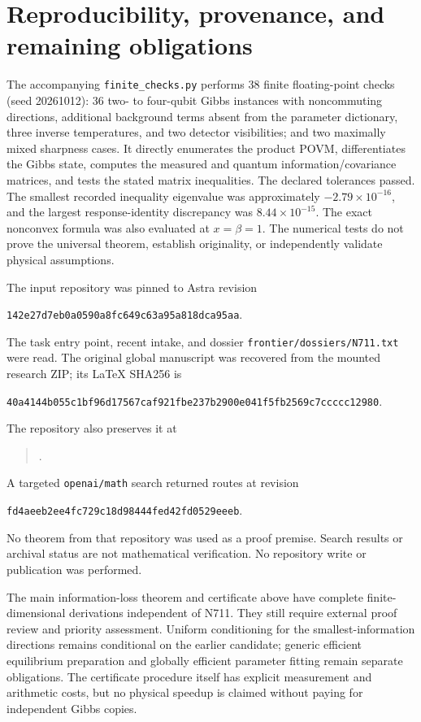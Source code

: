\documentclass[11pt,a4paper]{article}
\theoremstyle{remark}
\begin{document}
\section{Reproducibility, provenance, and remaining obligations}

The accompanying \texttt{finite\_checks.py} performs 38 finite floating-point checks (seed 20261012): 36 two- to four-qubit Gibbs instances with noncommuting directions, additional background terms absent from the parameter dictionary, three inverse temperatures, and two detector visibilities; and two maximally mixed sharpness cases. It directly enumerates the product POVM, differentiates the Gibbs state, computes the measured and quantum information/covariance matrices, and tests the stated matrix inequalities. The declared tolerances passed. The smallest recorded inequality eigenvalue was approximately $-2.79\times10^{-16}$, and the largest response-identity discrepancy was $8.44\times10^{-15}$. The exact nonconvex formula was also evaluated at $x=\beta=1$. The numerical tests do not prove the universal theorem, establish originality, or independently validate physical assumptions.

The input repository was pinned to Astra revision
\begin{center}\small\texttt{142e27d7eb0a0590a8fc649c63a95a818dca95aa}.\end{center}
The task entry point, recent intake, and dossier \texttt{frontier/dossiers/N711.txt} were read. The original global manuscript was recovered from the mounted research ZIP; its LaTeX SHA256 is
\begin{center}\footnotesize\texttt{40a4144b055c1bf96d17567caf921fbe237b2900e041f5fb2569c7ccccc12980}.\end{center}
The repository also preserves it at
\begin{quote}\small{}.\end{quote}
A targeted \texttt{openai/math} search returned routes at revision
\begin{center}\small\texttt{fd4aeeb2ee4fc729c18d98444fed42fd0529eeeb}.\end{center}
No theorem from that repository was used as a proof premise. Search results or archival status are not mathematical verification. No repository write or publication was performed.

The main information-loss theorem and certificate above have complete finite-dimensional derivations independent of N711. They still require external proof review and priority assessment. Uniform conditioning for the smallest-information directions remains conditional on the earlier candidate; generic efficient equilibrium preparation and globally efficient parameter fitting remain separate obligations. The certificate procedure itself has explicit measurement and arithmetic costs, but no physical speedup is claimed without paying for independent Gibbs copies.
\end{document}
